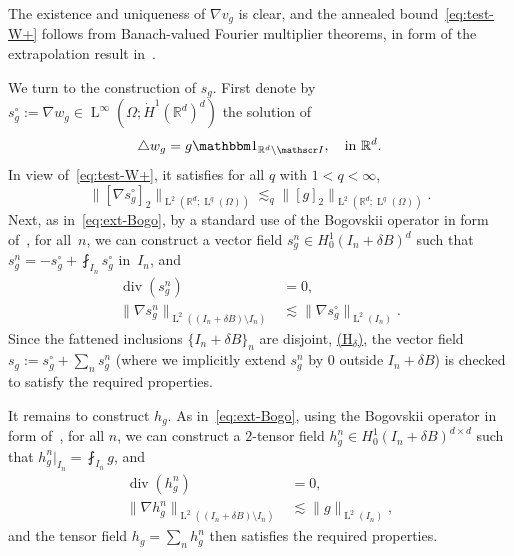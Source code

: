 \documentclass[JEP,XML,SOM,Unicode,published]{cedram}
\let\mathcal\mathscr
\newcommand{\Hd}{\hyperref[Hd]{\textup{(H$_\delta$)}}\xspace}
\let\mathds\mathbbm
\theoremstyle{plain}
\theoremstyle{definition}
\newcommand{\R}{\mathbb R}
\newcommand{\Ic}{\mathcal I}
\newcommand{\Ld}{\operatorname{L}}
\newcommand{\Div}{{\operatorname{div}}}
\begin{document}
The existence and uniqueness of $\nabla v_g$ is clear, and the annealed bound~\eqref{eq:test-W+} follows from Banach-valued Fourier multiplier theorems, \eg in form of the extrapolation result in~\cite[Th.\,3.15]{Kunstmann-Weis-04}.

We turn to the construction of $s_g$.
First denote by $s_g^\circ:=\nabla w_g\in\Ld^\infty(\Omega;\dot H^1(\R^d)^d)$ the solution of
\[\triangle w_g=g\mathds1_{\R^d\setminus\Ic},\quad\text{in $\R^d$}.\]
In view of~\eqref{eq:test-W+}, it satisfies for all $q$ with $1<q<\infty$,
\begin{equation*}
\|[\nabla s_g^\circ]_2\|_{\Ld^2(\R^d;\Ld^q(\Omega))}\lesssim_q \|[g]_2\|_{\Ld^2(\R^d;\Ld^q(\Omega))}.
\end{equation*}
Next, as in~\eqref{eq:ext-Bogo}, by a standard use of the Bogovskii operator in form of~\hbox{\cite[\!Th.\,III.3.1]{Galdi}}, for all~$n$, we can construct a vector field $s_g^n\in H^1_0(I_n+\delta B)^d$ such that $s_g^n=-s_g^\circ+\fint_{I_n}s_g^\circ$ in~$I_n$, and
\begin{align*}
\Div (s_g^n) &= 0,\\
\|\nabla s_g^n\|_{\Ld^2((I_n+\delta B)\setminus I_n)}&\lesssim \|\nabla s_g^\circ\|_{\Ld^2(I_n)}.
\end{align*}
Since the fattened inclusions $\{I_n+\delta B\}_n$ are disjoint, \cf \Hd, the vector field $s_g:=s_g^\circ+\sum_ns_g^n$ (where we implicitly extend $s_g^n$ by $0$ outside $I_n+\delta B$) is checked to satisfy the required properties.

It remains to construct $h_g$.
As in~\eqref{eq:ext-Bogo}, using the Bogovskii operator in form of~\cite[Th.\,III.3.1]{Galdi}, for all $n$, we can construct a $2$-tensor field $h_g^n \in H^1_0(I_n+\delta B)^{d\times d}$ such that $h_g^n|_{I_n}=\fint_{I_n}g$, and
\begin{align*}
\Div (h_g^n)&=0,\\
\|\nabla h_g^n\|_{\Ld^2((I_n+\delta B)\setminus I_n)}&\lesssim \|g\|_{\Ld^2(I_n)},
\end{align*}
and the tensor field $h_g=\sum_nh_g^n$ then satisfies the required properties.
\end{document}
